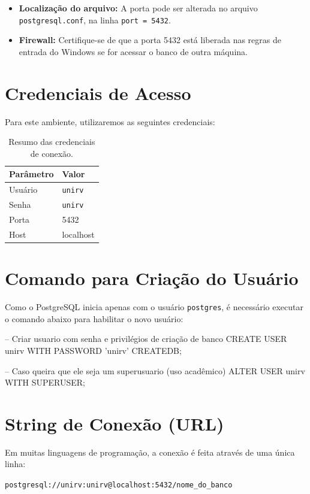\documentclass[12pt,a4paper,openright]{book}
\begin{document}
\begin{itemize}
    \item \textbf{Localização do arquivo:} A porta pode ser alterada no arquivo \texttt{postgresql.conf}, na linha \texttt{port = 5432}.
    \item \textbf{Firewall:} Certifique-se de que a porta 5432 está liberada nas regras de entrada do Windows se for acessar o banco de outra máquina.
\end{itemize}

\section{Credenciais de Acesso}
Para este ambiente, utilizaremos as seguintes credenciais:

\begin{table}[h!]
\centering
\begin{tabular}{|l|l|}
\hline
\textbf{Parâmetro} & \textbf{Valor} \\ \hline
Usuário            & \texttt{unirv} \\ \hline
Senha              & \texttt{unirv} \\ \hline
Porta              & 5432           \\ \hline
Host               & localhost      \\ \hline
\end{tabular}
\caption{Resumo das credenciais de conexão.}
\end{table}

\section{Comando para Criação do Usuário}
Como o PostgreSQL inicia apenas com o usuário \texttt{postgres}, é necessário executar o comando abaixo para habilitar o novo usuário:

\begin{sqlcode}
-- Criar usuario com senha e privilégios de criação de banco
CREATE USER unirv WITH PASSWORD 'unirv' CREATEDB;

-- Caso queira que ele seja um superusuario (uso acadêmico)
ALTER USER unirv WITH SUPERUSER;
\end{sqlcode}

\section{String de Conexão (URL)}
Em muitas linguagens de programação, a conexão é feita através de uma única linha:
\begin{center}
    \texttt{postgresql://unirv:unirv@localhost:5432/nome\_do\_banco}
\end{center}
\end{document}
